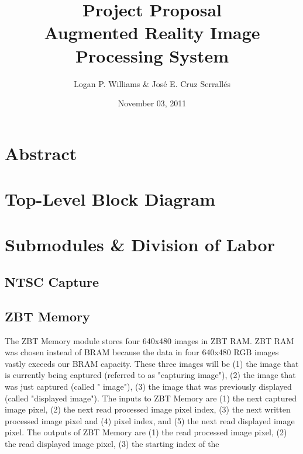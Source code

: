 \documentclass{article}
\begin{document}
\title{Project Proposal\\Augmented Reality Image Processing System}
\author{Logan P. Williams \& Jos\'{e} E. Cruz Serrall\'{e}s}
\date{November 03, 2011}
\maketitle

\section{Abstract}

\section{Top-Level Block Diagram}

\section{Submodules \& Division of Labor}
\subsection{NTSC Capture}

\subsection{ZBT Memory}
The ZBT Memory module stores four 640x480 images in ZBT RAM. ZBT RAM was chosen instead of BRAM because the data in four 640x480 RGB images vastly exceeds our BRAM capacity. These three images will be (1) the image that is currently being captured (referred to as "capturing image"), (2) the image that was just captured (called " image"), (3) the image that was previously displayed (called "displayed image"). The inputs to ZBT Memory are (1) the next captured image pixel, (2) the next read processed image pixel index, (3) the next written processed image pixel and (4) pixel index, and (5) the next read displayed image pixel. The outputs of ZBT Memory are (1) the read processed image pixel, (2) the read displayed image pixel, (3) the starting index of the 
\end{document}

